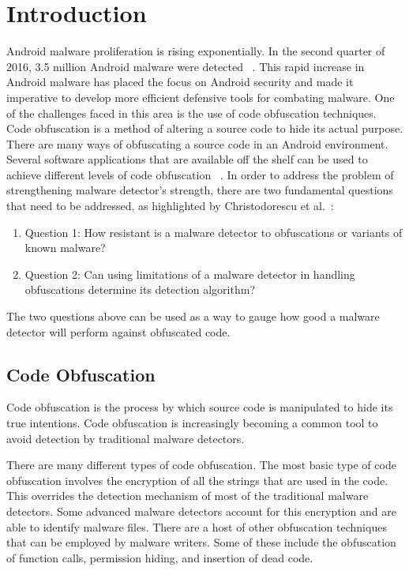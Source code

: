 \chapter{Introduction}

Android malware proliferation is rising exponentially. In the second quarter of 2016, 3.5 million Android malware were detected ~\cite{emm}. This rapid increase in Android malware has placed the focus on Android security and made it imperative to develop more efficient defensive tools for
combating malware. One of the challenges faced in this area is the use of code obfuscation techniques. Code obfuscation is a method of altering a source code to hide its actual purpose. There are many ways of obfuscating a source code in an Android environment. Several software
applications that are available off the shelf can be used to achieve different levels of code obfuscation ~\cite{Apvrille}. In order to address the problem of strengthening malware detector\rq s strength, there are two fundamental questions that need to be addressed, as highlighted by Christodorescu et al.~\cite{Christodorescu}:

\begin{enumerate}
	\item Question 1: How resistant is a malware detector to obfuscations or variants of known malware? 
	\item Question 2: Can using limitations of a malware detector in handling obfuscations determine its detection algorithm?
\end{enumerate}
The two questions above can be used as a way to gauge how good a malware detector will perform against obfuscated code.

\section{Code Obfuscation} 

Code obfuscation is the process by which source code is manipulated to hide its true intentions. Code obfuscation is increasingly becoming a common tool to avoid detection by traditional malware detectors.

There are many different types of code obfuscation. The most basic type of code obfuscation involves the encryption of all the strings that are used in the code. This overrides the detection mechanism of most of the traditional malware detectors. Some advanced malware detectors account for this encryption and are able to identify malware files. There are a host of other obfuscation techniques that can be employed by malware writers. Some of these include the obfuscation of function calls, permission hiding, and insertion of dead code.


